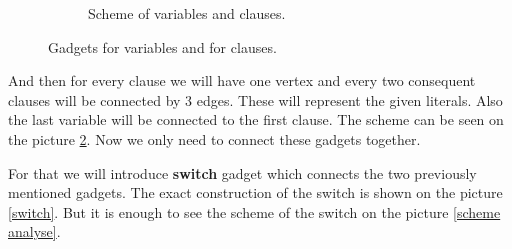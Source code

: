 \begin{figure}[!ht]
\begin{subfigure}{0.68\textwidth}
		\caption{Scheme of variables and clauses.}
		\label{clause var scheme}
	\end{subfigure}
	\caption{Gadgets for variables and for clauses.}
\end{figure}

And then for every clause we will have one vertex and every two consequent clauses will be connected by 3 edges. These will represent the given literals. Also the last variable will be connected to the first clause. The scheme can be seen on the picture \ref{clause var scheme}. Now we only need to connect these gadgets together.

For that we will introduce \textbf{switch} gadget which connects the two previously mentioned gadgets. The exact construction of the switch is shown on the picture \ref{switch}. But it is enough to see the scheme of the switch on the picture \ref{scheme analyse}.

